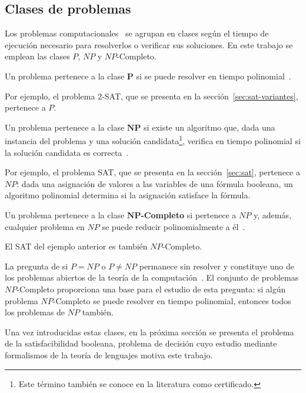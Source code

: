\subsection{Clases de problemas}

Los problemas computacionales~\cite{hopcroft2006introduction} se
agrupan en clases según el tiempo de ejecución necesario para
resolverlos o verificar sus soluciones. En este trabajo se emplean las
clases $P$, $NP$ y $NP$-Completo.

\begin{definicion}
Un problema pertenece a la clase $\boldsymbol{P}$ si se puede resolver
en tiempo polinomial~\cite{hopcroft2006introduction}.
\end{definicion}

Por ejemplo, el problema 2-SAT, que se presenta en la
sección~\ref{sec:sat-variantes}, pertenece a $P$.

\begin{definicion}
Un problema pertenece a la clase $\boldsymbol{NP}$ si existe un
algoritmo que, dada una instancia del problema y una solución
candidata\footnote{Este término también se conoce en la literatura
como certificado.}, verifica en tiempo polinomial si la solución
candidata es correcta~\cite{hopcroft2006introduction}.
\end{definicion}

Por ejemplo, el problema SAT, que se presenta en la
sección~\ref{sec:sat}, pertenece a $NP$: dada una asignación de
valores a las variables de una fórmula booleana, un algoritmo
polinomial determina si la asignación satisface la fórmula.

\begin{definicion}
Un problema pertenece a la clase $\boldsymbol{NP}$\textbf{-Completo}
si pertenece a $NP$ y, además, cualquier problema en $NP$ se puede
reducir polinomialmente a él~\cite{hopcroft2006introduction}.
\end{definicion}

El SAT del ejemplo anterior es también $NP$-Completo.

La pregunta de si $P = NP$ o $P \neq NP$ permanece sin resolver y
constituye uno de los problemas abiertos de la teoría de la
computación~\cite{hopcroft2006introduction}. El conjunto de problemas
$NP$-Completo proporciona una base para el estudio de esta pregunta:
si algún problema $NP$-Completo se puede resolver en tiempo
polinomial, entonces todos los problemas de $NP$ también.

Una vez introducidas estas clases, en la próxima sección se presenta
el problema de la satisfacibilidad booleana, problema de decisión cuyo
estudio mediante formalismos de la teoría de lenguajes motiva este
trabajo.

